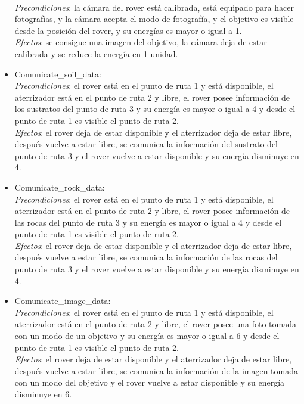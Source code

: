 \documentclass{uc3mpracticas}
\begin{document}
\begin{itemize}
    \\\textit{Precondiciones}: la cámara del rover está calibrada, está equipado para hacer fotografías, y la cámara acepta el modo de fotografía, y el objetivo es visible desde la posición del rover, y su energías es mayor o igual a 1.
    \\\textit{Efectos}: se consigue una imagen del objetivo, la cámara deja de estar calibrada y se reduce la energía en 1 unidad.
    \item Comunicate\_soil\_data:
    \\\textit{Precondiciones}: el rover está en el punto de ruta 1 y está disponible, el aterrizador está en el punto de ruta 2 y libre, el rover posee información de los sustratos del punto de ruta 3 y su energía es mayor o igual a 4 y desde el punto de ruta 1 es visible el punto de ruta 2.
    \\\textit{Efectos}: el rover deja de estar disponible y el aterrizador deja de estar libre, después vuelve a estar libre, se comunica la información del sustrato del punto de ruta 3 y el rover vuelve a estar disponible y su energía disminuye en 4.
    \item Comunicate\_rock\_data:
    \\\textit{Precondiciones}: el rover está en el punto de ruta 1 y está disponible, el aterrizador está en el punto de ruta 2 y libre, el rover posee información de las rocas del punto de ruta 3 y su energía es mayor o igual a 4 y desde el punto de ruta 1 es visible el punto de ruta 2.
    \\\textit{Efectos}: el rover deja de estar disponible y el aterrizador deja de estar libre, después vuelve a estar libre, se comunica la información de las rocas del punto de ruta 3 y el rover vuelve a estar disponible y su energía disminuye en 4.
    \item Comunicate\_image\_data:
    \\\textit{Precondiciones}: el rover está en el punto de ruta 1 y está disponible, el aterrizador está en el punto de ruta 2 y libre, el rover posee una foto tomada con un modo de un objetivo y su energía es mayor o igual a 6 y desde el punto de ruta 1 es visible el punto de ruta 2.
    \\\textit{Efectos}: el rover deja de estar disponible y el aterrizador deja de estar libre, después vuelve a estar libre, se comunica la información de la imagen tomada con un modo del objetivo y el rover vuelve a estar disponible y su energía disminuye en 6.
  \end{itemize}
\end{document}
